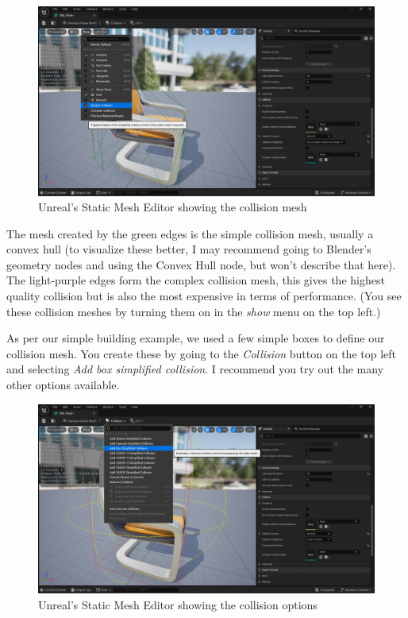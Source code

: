 \documentclass{article}
\begin{document}
\begin{figure}[h]
    \centering
    \includegraphics[width=1\textwidth]{day2images/image003.png}
    \caption{Unreal's Static Mesh Editor showing the collision mesh}
    \label{fig:unreal_static_mesh_editor}
\end{figure}

The mesh created by the green edges is the simple collision mesh, usually a convex hull (to visualize these better, I may recommend going to Blender's geometry nodes and using the Convex Hull node, but won't describe that here). The light-purple edges form the complex collision mesh, this gives the highest quality collision but is also the most expensive in terms of performance. (You see these collision meshes by turning them on in the \emph{show} menu on the top left.)

As per our simple building example, we used a few simple boxes to define our collision mesh. You create these by going to the \emph{Collision} button on the top left and selecting \emph{Add box simplified collision}. I recommend you try out the many other options available.

\begin{figure}[h]
    \centering
    \includegraphics[width=1\textwidth]{day2images/image004.png}
    \caption{Unreal's Static Mesh Editor showing the collision options}
    \label{fig:unreal_collision_options}
\end{figure}
\end{document}
